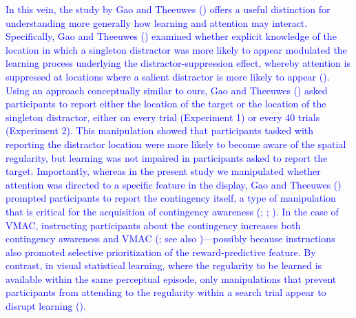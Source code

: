 \documentclass[
  man,
  floatsintext,
  longtable,
  nolmodern,
  notxfonts,
  notimes,
  mask,
  colorlinks=true,linkcolor=blue,citecolor=blue,urlcolor=blue]{apa7}
\begin{document}
\textcolor{blue}{In this vein, the study by Gao and Theeuwes
() offers a useful distinction for
understanding more generally how learning and attention may interact.
Specifically, Gao and Theeuwes () examined
whether explicit knowledge of the location in which a singleton
distractor was more likely to appear modulated the learning process
underlying the distractor-suppression effect, whereby attention is
suppressed at locations where a salient distractor is more likely to
appear (). Using an
approach conceptually similar to ours, Gao and Theeuwes
() asked participants to report either the
location of the target or the location of the singleton distractor,
either on every trial (Experiment 1) or every 40 trials (Experiment 2).
This manipulation showed that participants tasked with reporting the
distractor location were more likely to become aware of the spatial
regularity, but learning was not impaired in participants asked to
report the target. Importantly, whereas in the present study we
manipulated whether attention was directed to a specific feature in the
display, Gao and Theeuwes () prompted
participants to report the contingency itself, a type of manipulation
that is critical for the acquisition of contingency awareness
(; ; ). In the
case of VMAC, instructing participants about the contingency increases
both contingency awareness and VMAC
(;
see also )---possibly
because instructions also promoted selective prioritization of the
reward-predictive feature. By contrast, in visual statistical learning,
where the regularity to be learned is available within the same
perceptual episode, only manipulations that prevent participants from
attending to the regularity within a search trial appear to disrupt
learning ().}
\end{document}
